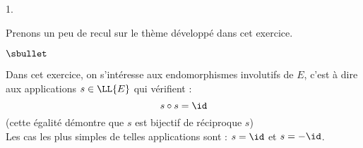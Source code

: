 \begin{noliste}{1.}


\newpage


\begin{remark}%
  Prenons un peu de recul sur le thème développé dans cet exercice.
  \begin{noliste}{$\sbullet$}
  \item Dans cet exercice, on s'intéresse aux endomorphismes
    involutifs de $E$, c'est à dire aux applications $s \in \LL{E}$
    qui vérifient :
    \[
    s \circ s = \id
    \]
    (cette égalité démontre que $s$ est bijectif de réciproque $s$)\\
    Les cas les plus simples de telles applications sont : $s = \id$
    et $s = -\id$.


\end{noliste}
\end{remark}
\end{noliste}

